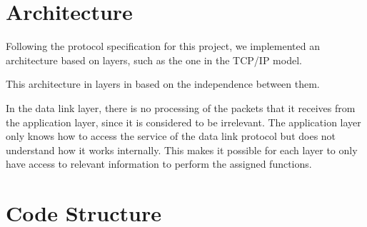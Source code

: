 \documentclass[11pt]{report}
\begin{document}
\chapter{Architecture}
Following the protocol specification for this project, we implemented an architecture based on layers, such as the one in the TCP/IP model. 

\begin{center}
\end{center}

This architecture in layers in based on the independence between them.

In the data link layer, there is no processing of the packets that it receives from the application layer, since it is considered to be irrelevant. The application layer only knows how to access the service of the data link protocol but does not understand how it works internally. This makes it possible for each layer to only have access to relevant information to perform the assigned functions. 
\newpage

\chapter{Code Structure}
\end{document}
